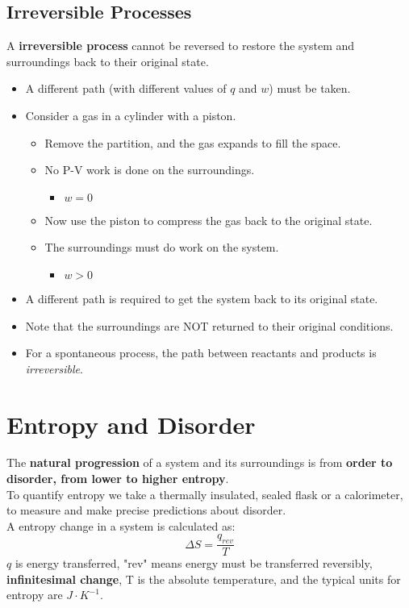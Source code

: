 \documentclass[10pt]{article}
\begin{document}
\subsection*{Irreversible Processes}
A \textbf{irreversible process} cannot be reversed to restore the system and surroundings back to their original state.
\begin{itemize}
    \item A different path (with different values of $q$ and $w$) must be taken.
    \item Consider a gas in a cylinder with a piston.
    \begin{itemize}
        \item Remove the partition, and the gas expands to fill the space.
        \item No P-V work is done on the surroundings.
        \begin{itemize}
            \item $w = 0$
        \end{itemize}
        \item Now use the piston to compress the gas back to the original state.
        \item The surroundings must do work on the system.
        \begin{itemize}
            \item $w > 0$
        \end{itemize}
    \end{itemize}
    \item A different path is required to get the system back to its original state.
    \item Note that the surroundings are NOT returned to their original conditions.
    \item For a spontaneous process, the path between reactants and products is \textit{irreversible}.
\end{itemize}

\section*{Entropy and Disorder}
The \textbf{natural progression} of a system and its surroundings is from \textbf{order to disorder, from lower to higher entropy}.\\
To quantify entropy we take a thermally insulated, sealed flask or a calorimeter, to measure and make precise predictions about disorder.\\
A entropy change in a system is calculated as:
\[\Delta S = \frac{q_{rev}}{T}\]
$q$ is energy transferred, "rev" means energy must be transferred reversibly, \textbf{infinitesimal change}, T is the absolute temperature, and the typical units for entropy are $J \cdot K^{-1}$.
\end{document}
